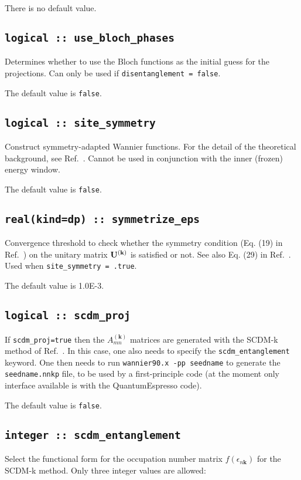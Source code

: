 There is no default value.

\subsection[use\_bloch\_phases]{\tt logical :: use\_bloch\_phases}

Determines whether to use the Bloch functions as the
initial guess for the projections. Can only be used if
\verb#disentanglement = false#.

The default value is \verb#false#.


\subsection[site\_symmetry]{\tt logical :: site\_symmetry}

Construct symmetry-adapted Wannier functions.
For the detail of the theoretical background, see Ref.~\cite{sakuma-prb13}.
Cannot be used in conjunction with the inner (frozen) energy window.

The default value is \verb#false#.

\subsection[symmetrize\_eps]{\tt real(kind=dp) :: symmetrize\_eps}

Convergence threshold to check whether the symmetry condition (Eq. (19) in Ref.~\cite{sakuma-prb13})
on the unitary matrix $\mathbf{U}^{(\mathbf{k})}$ is satisfied or not.
See also Eq. (29) in Ref.~\cite{sakuma-prb13}.
Used when \verb#site_symmetry = .true#.

The default value is 1.0E-3.

\subsection[scdm\_proj]{\tt logical :: scdm\_proj}
If {\tt scdm\_proj=true} then the $A_{mn}^{(\mathbf{k})}$ matrices are generated with the SCDM-k method of Ref.~\cite{LinLin-ArXiv2017}. In this case, one also needs to specify the {\tt scdm\_entanglement} keyword. One then needs to run {\tt wannier90.x -pp seedname} to generate the {\tt seedname.nnkp} file, to be used by a first-principle code (at the moment only interface available is with the QuantumEspresso code).

The default value is {\tt false}.

\subsection[scdm\_entanglement]{\tt integer :: scdm\_entanglement}
Select the functional form for the occupation number matrix $f(\epsilon_{n\mathbf{k}})$ for the SCDM-k method.
Only three integer values are allowed:

